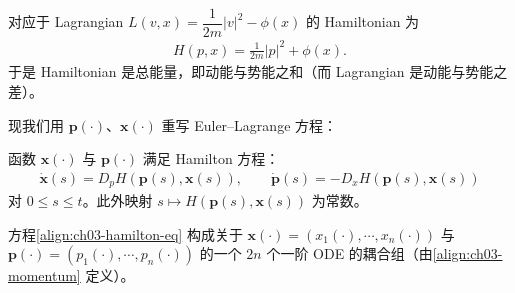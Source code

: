 \documentclass[../../main.tex]{subfiles}
\begin{document}
\begin{example}[续上例]\label{example:ch03-hamiltonian-energy}对应于 Lagrangian $L(v,x)=\dfrac{1}{2m}|v|^2-\phi(x)$ 的 Hamiltonian 为
\begin{align*}
H(p,x)=\frac{1}{2m}|p|^2+\phi(x).
\end{align*}
于是 Hamiltonian 是总能量，即动能与势能之和（而 Lagrangian 是动能与势能之差）。
\end{example}

现我们用 $\mathbf{p}(\cdot)$、$\mathbf{x}(\cdot)$ 重写 Euler--Lagrange 方程：

\begin{theorem}\label{theorem:ch03-hamilton-ode}函数 $\mathbf{x}(\cdot)$ 与 $\mathbf{p}(\cdot)$ 满足 Hamilton 方程：
\begin{align}\label{align:ch03-hamilton-eq}
\dot{\mathbf{x}}(s)=D_p H(\mathbf{p}(s),\mathbf{x}(s)),\qquad \dot{\mathbf{p}}(s)=-D_x H(\mathbf{p}(s),\mathbf{x}(s))
\end{align}
对 $0\leqslant s\leqslant t$。此外映射 $s\mapsto H(\mathbf{p}(s),\mathbf{x}(s))$ 为常数。
\end{theorem}

方程\eqref{align:ch03-hamilton-eq} 构成关于 $\mathbf{x}(\cdot)=(x_1(\cdot),\cdots,x_n(\cdot))$ 与 $\mathbf{p}(\cdot)=(p_1(\cdot),\cdots,p_n(\cdot))$ 的一个 $2n$ 个一阶 ODE 的耦合组（由\eqref{align:ch03-momentum} 定义）。
\end{document}
